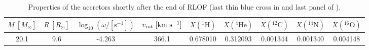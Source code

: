 
    \begin{table*}[hbpt]
    \centering
    \begin{tabular}{c|c|c|c|c|c|c|c|c}
    \hline\hline
    $M \ [M_\odot]$ & $R\ [R_\odot]$ & $\log_{10}(\omega / [\mathrm{s^{-1}}])$ & $v_\mathrm{rot} \ [{\mathrm{km\ s^{-1}}}] $ & $X(^{1}\mathrm{H})$ & $X(^{4}\mathrm{He})$ & $X(^{12}\mathrm{C})$ & $X(^{14}\mathrm{N})$ & $X(^{16}\mathrm{O})$ \\
    \hline
    20.1 & 9.6 & -4.263 & 366.1 & 0.678010 & 0.312093 & 0.001344 & 0.001340 & 0.004148 \\
    \hline
    \end{tabular}
    \caption{Properties of the accretors shortly after the end of RLOF
    (last thin blue cross in  and last panel of ).}
    \label{tab:surf_prop}
    \end{table*}

